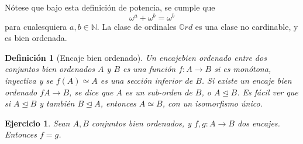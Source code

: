 \documentclass[12pt,letterpaper,titlepage]{article}
\newtheorem*{defn}{Definición}
\newtheorem{exe}{Ejercicio}
\theoremstyle{definition}
\newcommand\<{\langle}
\renewcommand\>{\rangle}
\begin{document}
Nótese que bajo esta definición de potencia, se cumple que 
$$\omega^a+\omega^b=\omega^b$$
para cualesquiera $a,b\in\mathbb{N}$.
La clase de ordinales $\mathbb{O}rd$ es una clase no cardinable, y es bien ordenada.
\begin{defn}[Encaje bien ordenado]
Un encajebien ordenado entre dos conjuntos bien ordenados $A$ y $B$ es una función $f:A\to B$ si es monótona, inyectiva y se $f(A)\simeq A$ es una sección inferior de $B$.
Si existe un encaje bien ordenado $fA\to B$, se dice que $A$ es un sub-orden de $B$, o $A\trianglelefteq B$.
Es fácil ver que si $A\trianglelefteq B$ y también $B\trianglelefteq A$, entonces $A\simeq B$, con un isomorfismo único.
\end{defn}
\begin{exe}%
  Sean $A, B$ conjuntos bien ordenados, y $f,g:A\to B$ dos encajes. Entonces $f=g$.
\end{exe}
\end{document}
